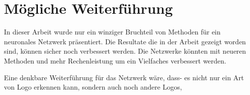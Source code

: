 \documentclass[12pt,a4paper]{report}
\begin{document}
\section{Mögliche Weiterführung}
In dieser Arbeit wurde nur ein winziger Bruchteil von Methoden für ein neuronales Netzwerk präsentiert.
Die Resultate die in der Arbeit gezeigt worden sind, können sicher noch verbessert werden.
Die Netzwerke könnten mit neueren Methoden und mehr Rechenleistung um ein Vielfaches verbessert werden.

Eine denkbare Weiterführung für das Netzwerk wäre, dass-                                                                                                                                                                                                                                                                                                                                                                                                                                                                                                                                                                                                                                                                                                                                                                                                                                                                                                                                                                                                                                                                                                                                                                                                                                                                                                                                                                                                                                                                                                                                                                                                                                                                                                                                                                                                                                                                                                                                                                                                                                                                                                                                                                                                                                                                                                                                                                                                                                                                                                                                                                                                                                                                                                                                                                                                                             es nicht nur ein Art von Logo erkennen kann, sondern auch noch andere Logos,
\end{document}

